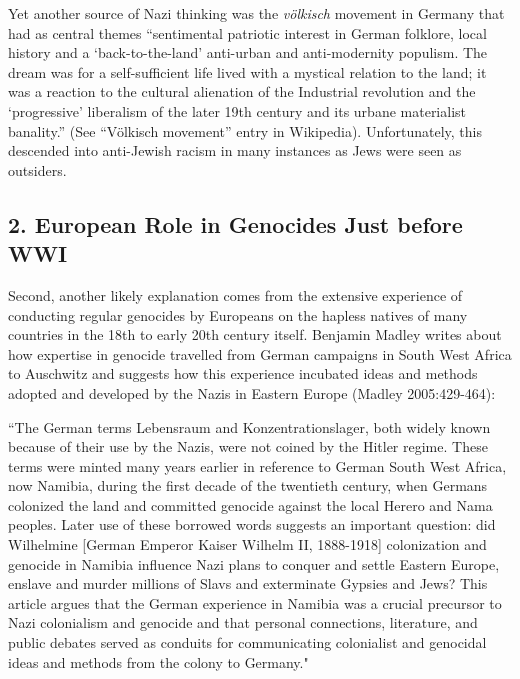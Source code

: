 Yet another source of Nazi thinking was the {\sl völkisch} movement in Germany that had as central themes “sentimental patriotic interest in German folklore, local history and a ‘back-to-the-land’ anti-urban and anti-modernity populism. The dream was for a self-sufficient life lived with a mystical relation to the land; it was a reaction to the cultural alienation of the Industrial revolution and the ‘progressive’ liberalism of the later 19th century and its urbane materialist banality.” (See “Völkisch movement” entry in Wikipedia). Unfortunately, this descended into anti-Jewish racism in many instances as Jews were seen as outsiders.

\subsection*{2. European Role in Genocides Just before WWI}

Second, another likely explanation comes from the extensive experience of conducting regular genocides by Europeans on the hapless natives of many countries in the 18th to early 20th century itself. Benjamin Madley writes about how expertise in genocide travelled from German campaigns in South West Africa to Auschwitz and suggests how this experience incubated ideas and methods adopted and developed by the Nazis in Eastern Europe (Madley 2005:429-464):

\begin{myquote}
``The German terms Lebensraum and Konzentrationslager, both widely known because of their use by the Nazis, were not coined by the Hitler regime. These terms were minted many years earlier in reference to German South West Africa, now Namibia, during the first decade of the twentieth century, when Germans colonized the land and committed genocide against the local Herero and Nama peoples. Later use of these borrowed words suggests an important question: did Wilhelmine [German Emperor Kaiser Wilhelm II, 1888-1918] colonization and genocide in Namibia  influence Nazi plans to conquer and settle Eastern Europe, enslave and murder millions of Slavs and exterminate Gypsies and Jews? This article argues that the German experience in Namibia was a crucial precursor to Nazi colonialism and genocide and that personal connections, literature, and public debates served as conduits for communicating colonialist and genocidal ideas and methods from the colony to Germany."
\end{myquote}

